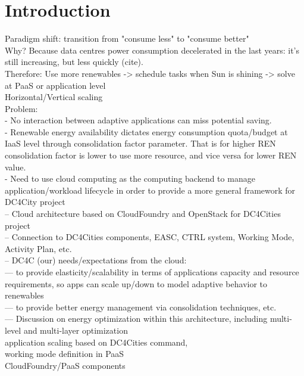 \section{Introduction}
\label{sec: intro}

Paradigm shift: transition from "consume less" to "consume better" \\
Why? Because data centres power consumption decelerated in the last years: it's still increasing, but less quickly (cite). \\

Therefore: Use more renewables -> schedule tasks when Sun is shining -> solve at PaaS or application level \\
Horizontal/Vertical scaling \\

Problem: \\
- No interaction between adaptive applications can miss potential saving. \\
- Renewable energy availability dictates energy consumption quota/budget at IaaS level through consolidation factor parameter. That is for higher REN consolidation factor is lower to use more resource, and vice versa for lower REN value. \\
- Need to use cloud computing as the computing backend to manage application/workload lifecycle in order to provide a more general framework for DC4City project \\
-- Cloud architecture based on CloudFoundry and OpenStack for DC4Cities project \\
-- Connection to DC4Cities components, EASC, CTRL system, Working Mode, Activity Plan, etc. \\
-- DC4C (our) needs/expectations from the cloud: \\
--- to provide elasticity/scalability in terms of applications capacity and resource requirements, so apps can scale up/down to model adaptive behavior to renewables \\
--- to provide better energy management via consolidation techniques, etc. \\
--- Discussion on energy optimization within this architecture, including multi-level and multi-layer optimization \\


application scaling based on DC4Cities command, \\
working mode definition in PaaS \\

CloudFoundry/PaaS components \\

